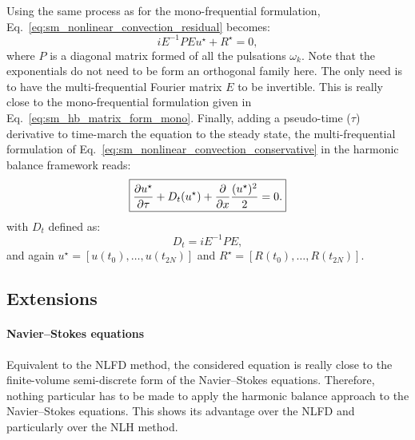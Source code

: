 Using the same process as for the mono-frequential formulation,
Eq.~\eqref{eq:sm_nonlinear_convection_residual} becomes:
\begin{equation}
	i E^{-1} P E u^\star + R^\star = 0,
\end{equation}
where $P$ is a diagonal matrix formed of all the pulsations $\omega_k$.
Note that the exponentials do not need to be form an
orthogonal family here. The only need is to have the multi-frequential
Fourier matrix $E$ to be invertible.
This is really close to the mono-frequential formulation given
in Eq.~\eqref{eq:sm_hb_matrix_form_mono}.
Finally, adding a pseudo-time ($\tau$) derivative 
to time-march the equation to the steady state,
the multi-frequential formulation of 
Eq.~\eqref{eq:sm_nonlinear_convection_conservative} in the harmonic
balance framework reads:
\begin{equation}
	\fbox{$
	\displaystyle \frac{\partial u^\star}{\partial \tau} +
	D_t (u^\star) + 
	\displaystyle \frac{\partial}{\partial x}
		\frac{(u^\star)^2}{2} = 0.
	$}
\end{equation}
with $D_t$ defined as:
\begin{equation}
	D_t = i E^{-1} P E,
	\label{eq:sm_multi_spectral_operator}
\end{equation}
and again $u^\star = [u(t_0), \ldots, u(t_{2N})]$ 
and $R^\star = [R(t_0), \ldots, R(t_{2N})]$.

\subsection{Extensions}

\paragraph{Navier--Stokes equations}
Equivalent to the NLFD method, the
considered equation is really close to the finite-volume
semi-discrete form of the Navier--Stokes equations. Therefore,
nothing particular has to be made to apply the harmonic balance approach
to the Navier--Stokes equations.
This shows its advantage over the NLFD and particularly over the NLH method.

